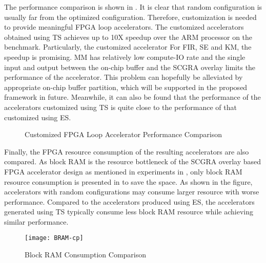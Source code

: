 The performance comparison is shown in . It is clear that random configuration is usually far from the optimized configuration. Therefore, customization is needed to provide meaningful FPGA loop accelerators. The customized accelerators obtained using TS achieves up to 10X speedup over the ARM processor on the benchmark. Particularly, the customized accelerator For FIR, SE and KM, the speedup is promising. MM has relatively low compute-IO rate and the single input and output between the on-chip buffer and the SCGRA overlay limits the performance of the accelerator. This problem can hopefully be alleviated by appropriate on-chip buffer partition, which will be supported in the proposed framework in future. Meanwhile, it can also be found that the performance of the accelerators customized using TS is quite close to the performance of that customized using ES. 

\begin{figure}[htb]
\centering
	\subfigure[MM]{%
		\texttt{[image: mm-cp]}
	}
    \hfill
	\subfigure[SE]{%
		\texttt{[image: se-cp]}
	}
	\subfigure[KM]{%
		\texttt{[image: km-cp]}
	}
    \caption{Customized FPGA Loop Accelerator Performance Comparison}
	\label{fig:DSE}
\end{figure}

Finally, the FPGA resource consumption of the resulting accelerators are also compared. As block RAM is the resource bottleneck of the SCGRA overlay based FPGA accelerator design as mentioned in experiments in , only block RAM resource consumption is presented in  to save the space. As shown in the figure, accelerators with random configurations may consume larger resource with worse performance. Compared to the accelerators produced using ES, the accelerators generated using TS typically consume less block RAM resource while achieving similar performance.

\begin{figure}[htb]
    \centering
    \texttt{[image: BRAM-cp]}
    \caption{Block RAM Consumption Comparison}
    \label{fig:BRAM-cp}
\end{figure}

